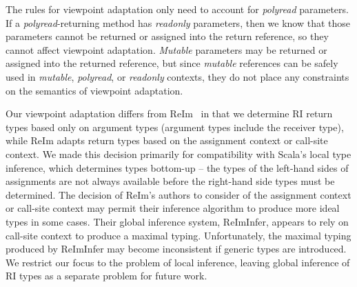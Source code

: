 The rules for viewpoint adaptation only need to account for \emph{polyread} parameters.
If a \emph{polyread}-returning method has \emph{readonly} parameters,
then we know that those parameters cannot be returned or assigned into the return reference,
so they cannot affect viewpoint adaptation.
\emph{Mutable} parameters may be returned or assigned into the returned reference,
but since \emph{mutable} references can be safely used in \emph{mutable}, \emph{polyread},
or \emph{readonly} contexts, they do not place any constraints on
the semantics of viewpoint adaptation.

Our viewpoint adaptation differs from ReIm~\cite{reim} in that
we determine RI return types based only on argument types
(argument types include the receiver type), while
ReIm adapts return types based on the assignment context or call-site context.
We made this decision primarily for compatibility with Scala's local type inference,
which determines types bottom-up -- the types of the left-hand sides
of assignments are not always available before the right-hand side types
must be determined.
The decision of ReIm's authors to consider of the assignment context or call-site context
may permit their inference algorithm to produce more ideal types
in some cases.
Their global inference system, ReImInfer, appears to rely
on call-site context to produce a maximal typing.
Unfortunately, the maximal typing produced by ReImInfer may become inconsistent
if generic types are introduced.
We restrict our focus to the problem of local inference,
leaving global inference of RI types as a separate problem
for future work.

\begin{comment}
The difference is due to the nature of the inference used.
ReImInfer is a global inference system, but Scala uses local type inference.
Under local type inference, the type of the right-hand side of an assignment
is determined without taking the type of the left-hand side into account.
Therefore, we can expect the parameter types to be available at a function
application site, but not necessarily the type that the return value must
be adpated to.
Because of the restrictions of local type inference,
we cannot guarantee a ``best'' typing like ReImInfer.
However, we should note that ReImInfer does not support generic types,
and it is questionable whether the approach it takes can
find best typings that will type-check correctly in the presence of generics.
We consider global inference and local inference to be separate problems.
Where global inference addresses the issue of generating or suggesting annotations
for non-annotated code, local inference is normally used to reduce the programmer's
annotation burden when working with annotated code.
Our work focuses on the integration of RI types with local type inference,
leaving global inference as a possibility for future work.
\end{comment}

